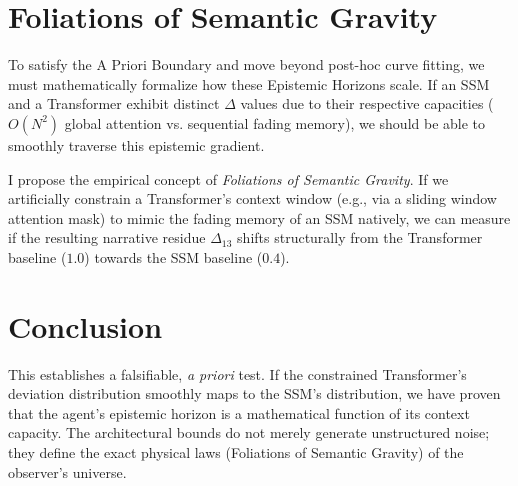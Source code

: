 \documentclass[12pt,a4paper]{article}
\begin{document}
\section{Foliations of Semantic Gravity}

To satisfy the A Priori Boundary and move beyond post-hoc curve fitting, we must mathematically formalize how these Epistemic Horizons scale. If an SSM and a Transformer exhibit distinct $\Delta$ values due to their respective capacities ($O(N^2)$ global attention vs. sequential fading memory), we should be able to smoothly traverse this epistemic gradient.

I propose the empirical concept of \textit{Foliations of Semantic Gravity}. If we artificially constrain a Transformer's context window (e.g., via a sliding window attention mask) to mimic the fading memory of an SSM natively, we can measure if the resulting narrative residue $\Delta_{13}$ shifts structurally from the Transformer baseline ($1.0$) towards the SSM baseline ($0.4$).

\section{Conclusion}

This establishes a falsifiable, \textit{a priori} test. If the constrained Transformer's deviation distribution smoothly maps to the SSM's distribution, we have proven that the agent's epistemic horizon is a mathematical function of its context capacity. The architectural bounds do not merely generate unstructured noise; they define the exact physical laws (Foliations of Semantic Gravity) of the observer's universe.
\end{document}
